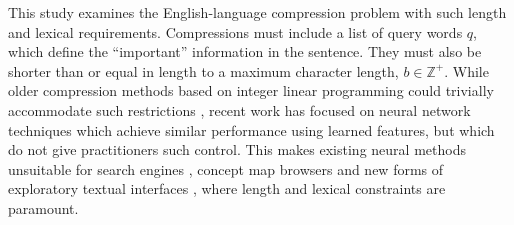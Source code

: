 \documentclass[11pt,a4paper]{article}
\begin{document}
This study examines the English-language compression problem with such length and lexical requirements. Compressions must include a list of query words $q$, which define the ``important'' information in the sentence. They must also be shorter than or equal in length to a maximum character length, $b \in \mathbb{Z}^{+}$. While older compression methods based on integer linear programming could trivially accommodate such restrictions \cite{clarke2008global,filippova2013overcoming}, recent work has focused on neural network techniques \cite{filippova2015sentence} which achieve similar performance using learned features, but which do not give practitioners such control. This makes existing neural methods unsuitable for search engines \cite{hearst2009search}, concept map browsers \cite{falke2017graphdocexplore} and new forms of exploratory textual interfaces \cite{marchionini2006exploratory}, where length and lexical constraints are paramount. 

\begin{figure}[htb!]
\end{figure}
\end{document}
